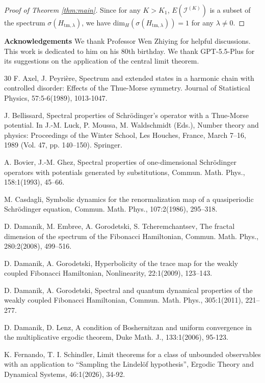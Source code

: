 \documentclass{amsart}
\theoremstyle{definition}
\begin{document}
\begin{proof}[Proof of Theorem \ref{thm:main}]
Since for any $K>K_1$, $E(\mathcal{I}^{(K)})$ is a subset of the spectrum 
$\sigma(H_{\mathrm{tm},\lambda})$,
we have $\mathrm{dim}_{H}(\sigma(H_{\mathrm{tm},\lambda}))=1$ for any $\lambda\ne0$.
\end{proof}

\smallskip
\noindent\textbf{Acknowledgements}
We thank Professor Wen Zhiying for helpful discussions. 
This work is dedicated to him on his 80th birthday.
We thank GPT-5.5-Plus for its suggestions on the application of the central limit theorem.

\begin{thebibliography}{30}
F. Axel, J. Peyrière, Spectrum and extended states in a harmonic chain with controlled disorder: 
Effects of the Thue-Morse symmetry. Journal of Statistical Physics, 57:5-6(1989), 1013-1047.

J. Bellissard, Spectral properties of Schrödinger's operator with a Thue-Morse potential. 
In J.-M. Luck, P. Moussa, M. Waldschmidt (Eds.), 
Number theory and physics: Proceedings of the Winter School, 
Les Houches, France, March 7–16, 1989 (Vol. 47, pp. 140–150). Springer.

A. Bovier, J.-M. Ghez,
Spectral properties of one-dimensional Schr\"odinger operators with
potentials generated by substitutions,
Commun. Math. Phys., 158:1(1993), 45--66.

M. Casdagli,
Symbolic dynamics for the renormalization map of a quasiperiodic
Schr\"odinger equation,
Commun. Math. Phys., 107:2(1986), 295--318.

D. Damanik, M. Embree, A. Gorodetski, S. Tcheremchantsev,
The fractal dimension of the spectrum of the Fibonacci Hamiltonian,
Commun. Math. Phys., 280:2(2008), 499--516.

D. Damanik, A. Gorodetski,
Hyperbolicity of the trace map for the weakly coupled Fibonacci
Hamiltonian,
Nonlinearity, 22:1(2009), 123--143.

D. Damanik, A. Gorodetski,
Spectral and quantum dynamical properties of the weakly coupled
Fibonacci Hamiltonian,
Commun. Math. Phys., 305:1(2011), 221--277.

D. Damanik, D. Lenz, A condition of Boshernitzan and uniform convergence in the multiplicative ergodic theorem, Duke Math. J., 133:1(2006), 95-123.

 K. Fernando, T. I. Schindler, 
Limit theorems for a class of unbounded observables with an application to 
``Sampling the Lindelöf hypothesis'',  
Ergodic Theory and Dynamical Systems, 46:1(2026), 34-92.


\end{thebibliography}
\end{document}
